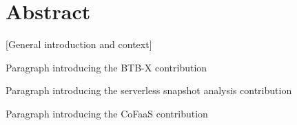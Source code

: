 \documentclass[../main.tex]{subfiles}
\begin{document}
\chapter{Abstract}


[General introduction and context]

Paragraph introducing the BTB-X contribution

Paragraph introducing the serverless snapshot analysis contribution

Paragraph introducing the CoFaaS contribution
\end{document}
